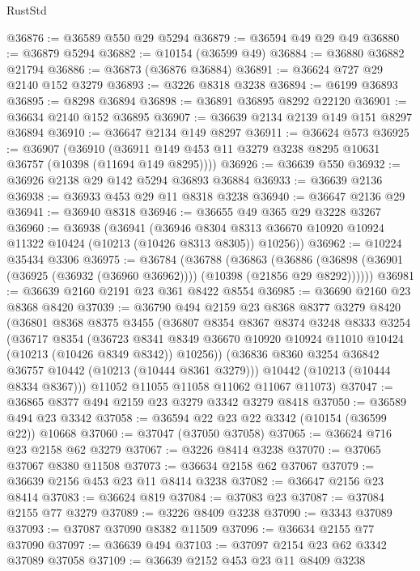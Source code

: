 \begin{lexlean}{RustStd}
\begin{coremodule}
{\begin{coremodule}
{{{{{{{{{{{{{{{{{{{{{{{{{{@36876 := @36589 @550 @29 @5294
@36879 := @36594 @49 @29 @49
@36880 := @36879 @5294
@36882 := @10154 (@36599 @49)
@36884 := @36880 @36882 @21794
@36886 := @36873 (@36876 @36884)
@36891 := @36624 @727 @29 @2140 @152 @3279
@36893 := @3226 @8318 @3238
@36894 := @6199 @36893
@36895 := @8298 @36894
@36898 := @36891 @36895 @8292 @22120
@36901 := @36634 @2140 @152 @36895
@36907 := @36639 @2134 @2139 @149 @151 @8297 @36894
@36910 := @36647 @2134 @149 @8297
@36911 := @36624 @573
@36925 := @36907
    (@36910 (@36911 @149 @453 @11 @3279 @3238 @8295 @10631 @36757 (@10398 (@11694 @149 @8295))))
@36926 := @36639 @550
@36932 := @36926 @2138 @29 @142 @5294 @36893 @36884
@36933 := @36639 @2136
@36938 := @36933 @453 @29 @11 @8318 @3238
@36940 := @36647 @2136 @29
@36941 := @36940 @8318
@36946 := @36655 @49 @365 @29 @3228 @3267
@36960 := @36938
    (@36941
      (@36946 @8304 @8313 @36670 @10920 @10924 @11322 @10424 (@10213 (@10426 @8313 @8305)) @10256))
@36962 := @10224 @35434 @3306
@36975 := @36784
    (@36788
      (@36863
        (@36886 (@36898 (@36901 (@36925 (@36932 (@36960 @36962)))) (@10398 (@21856 @29 @8292))))))
@36981 := @36639 @2160 @2191 @23 @361 @8422 @8554
@36985 := @36690 @2160 @23 @8368 @8420
@37039 := @36790
    @494
    @2159
    @23
    @8368
    @8377
    @3279
    @8420
    (@36801
      @8368
      @8375
      @3455
      (@36807
        @8354
        @8367
        @8374
        @3248
        @8333
        @3254
        (@36717
          @8354
          (@36723
            @8341
            @8349
            @36670
            @10920
            @10924
            @11010
            @10424
            (@10213 (@10426 @8349 @8342))
            @10256))
        (@36836 @8360 @3254 @36842 @36757 @10442 (@10213 (@10444 @8361 @3279)))
        @10442
        (@10213 (@10444 @8334 @8367)))
      @11052
      @11055
      @11058
      @11062
      @11067
      @11073)
@37047 := @36865 @8377 @494 @2159 @23 @3279 @3342 @3279 @8418
@37050 := @36589 @494 @23 @3342
@37058 := @36594 @22 @23 @22 @3342 (@10154 (@36599 @22)) @10668
@37060 := @37047 (@37050 @37058)
@37065 := @36624 @716 @23 @2158 @62 @3279
@37067 := @3226 @8414 @3238
@37070 := @37065 @37067 @8380 @11508
@37073 := @36634 @2158 @62 @37067
@37079 := @36639 @2156 @453 @23 @11 @8414 @3238
@37082 := @36647 @2156 @23 @8414
@37083 := @36624 @819
@37084 := @37083 @23
@37087 := @37084 @2155 @77 @3279
@37089 := @3226 @8409 @3238
@37090 := @3343 @37089
@37093 := @37087 @37090 @8382 @11509
@37096 := @36634 @2155 @77 @37090
@37097 := @36639 @494
@37103 := @37097 @2154 @23 @62 @3342 @37089 @37058
@37109 := @36639 @2152 @453 @23 @11 @8409 @3238
}}}}}}}}}}}}}}}}}}}}}}}}}}
\end{coremodule}}
\end{coremodule}
\end{lexlean}
